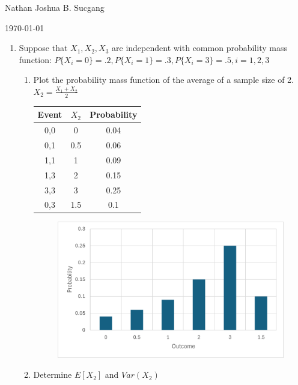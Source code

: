\documentclass{article}
\begin{document}
Nathan Joshua B. Sucgang

\today

\begin{enumerate}
    \item Suppose that $X_1, X_2, X_3$ are independent with common probability mass function: $P\{X_i = 0 \} = .2, P\{X_i = 1 \} = .3, P\{X_i = 3 \} = .5, i = 1,2,3$
    \begin{enumerate}
        \item Plot the probability mass function of the average of a sample size of 2. $X_2 = \frac{X_1+X_2}{2}$
        
        \begin{tabular}{|c|c|c|}
                \hline
                \textbf{Event} & \bf{$X_2$} & \textbf{Probability} \\
                \hline
                0,0 & 0 & 0.04 \\
                0,1 & 0.5 & 0.06 \\
                1,1 & 1 & 0.09 \\
                1,3 & 2 & 0.15 \\
                3,3 & 3 & 0.25 \\
                0,3 & 1.5 & 0.1 \\
                \hline
                \end{tabular}
        \begin{figure}[!htbp]
                \centerline{\includegraphics[keepaspectratio]{Picture/Picture1.png}}
                \label{fig1}
            \end{figure}

            
        \item Determine $E[X_2]$ and $Var(X_2)$
        

\end{enumerate}
\end{enumerate}
\end{document}
